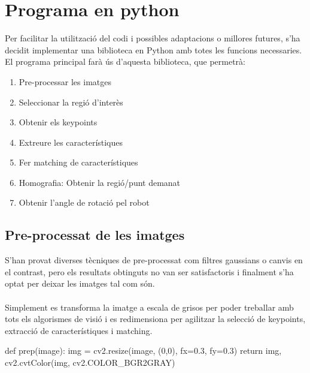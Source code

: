 \section{Programa en python}
	Per facilitar la utilització del codi i possibles adaptacions o millores futures, s'ha decidit implementar una biblioteca en Python amb totes les funcions necessaries. El programa principal farà ús
	d'aquesta biblioteca, que permetrà:
	
	\begin{enumerate}
		\item{Pre-processar les imatges}
		\item{Seleccionar la regió d'interès}
		\item{Obtenir els keypoints}
		\item{Extreure les característiques}
		\item{Fer matching de característiques}
		\item{Homografia: Obtenir la regió/punt demanat}
		\item{Obtenir l'angle de rotació pel robot}
	\end{enumerate}

	\subsection{Pre-processat de les imatges}
		S'han provat diverses tècniques de pre-processat com filtres gaussians o canvis en el contrast, pero els resultats obtinguts no van ser satisfactoris i finalment s'ha optat per deixar
		les imatges tal com són.\\\\
		Simplement es transforma la imatge a escala de grisos per poder treballar amb tots els algorismes de visió i es redimensiona per agilitzar la selecció de keypoints, extracció
		de característiques i matching.\\
		\begin{python}
def prep(image):
	img = cv2.resize(image, (0,0), fx=0.3, fy=0.3)
	return img, cv2.cvtColor(img, cv2.COLOR_BGR2GRAY)
		\end{python}
